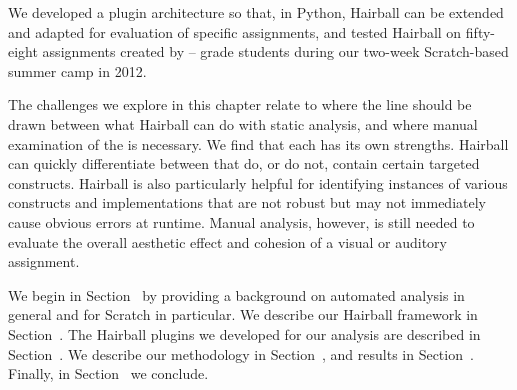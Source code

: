 We developed a plugin architecture so that, in Python, Hairball can be extended
and adapted for evaluation of specific assignments, and tested Hairball on
fifty-eight assignments created by -- grade students during our
two-week Scratch-based summer camp in 2012.

The challenges we explore in this chapter relate to where the line should be
drawn between what Hairball can do with static analysis, and where manual
examination of the \sprogram{} is necessary.  We find that each has its own
strengths.  Hairball can quickly differentiate between  that do, or
do not, contain certain targeted constructs. Hairball is also particularly
helpful for identifying instances of various constructs and implementations
that are not robust but may not immediately cause obvious errors at runtime.
Manual analysis, however, is still needed to evaluate the overall aesthetic
effect and cohesion of a visual or auditory assignment.

We begin in Section~ by providing a background on
automated analysis in general and for Scratch in particular. We describe our
Hairball framework in Section~. The Hairball plugins we
developed for our analysis are described in Section~. We
describe our methodology in Section~, and results in
Section~. Finally, in Section~ we
conclude.
